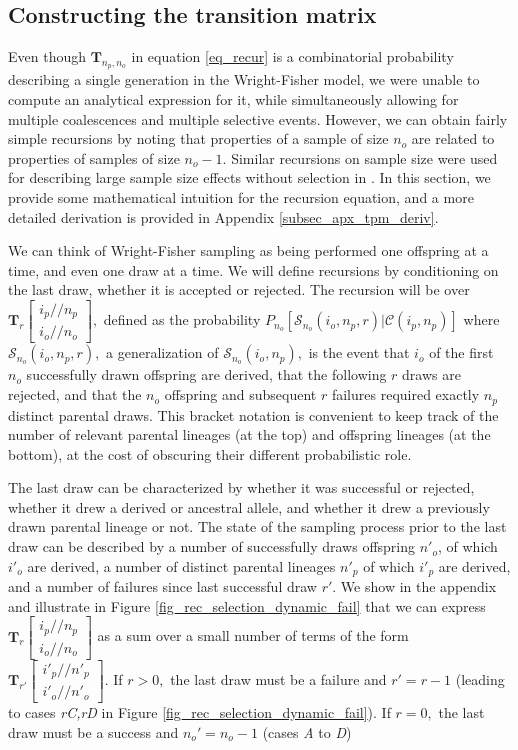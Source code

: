 \documentclass[review]{elsarticle}
\newcommand{\dslash}{/\!\!/}
\newcommand{\Coalc}[4]{\begin{bmatrix}#1\dslash #2 \\ #3\dslash #4 \end{bmatrix}}
\newcommand{\ms}{\mathcal{S}}
\begin{document}
\subsection{Constructing the transition matrix}
\label{subsec_trans_mat}

Even though $\mathbf{T}_{n_p,n_o}$ in equation \ref{eq_recur} is a combinatorial probability
describing a single generation in the Wright-Fisher model, we were unable to compute an analytical
expression for it, while simultaneously allowing for multiple coalescences and multiple selective events. 
However,
we can obtain fairly simple recursions by noting that properties of a sample of size $n_o$ are
related to properties of samples of size $n_o-1.$ Similar recursions on sample size were used for
describing large sample size effects without selection in \citep{BhaskarEtAl2014}. In this section,
we provide some mathematical intuition for the recursion equation, and a more detailed derivation is provided in
Appendix \ref{subsec_apx_tpm_deriv}.

We can think of Wright-Fisher sampling as being performed one offspring at a time,
and even one draw at a time. We will define recursions by conditioning on the last draw, 
whether it is accepted or rejected. 
The recursion will be over $\mathbf{T}_{r}\Coalc{i_p}{n_p}{i_o}{n_o},$ defined as the probability
$P_{n_o}\left[\ms_{n_o}(i_o, n_p, r) | \mathcal{C}(i_p, n_p)\right]$ where $\ms_{n_o}(i_o, n_p, r),$ 
a generalization of  $\ms_{n_o}(i_o, n_p),$ 
is the event that $i_o$ of the first $n_o$ successfully drawn offspring are derived, 
that the following $r$ draws are rejected, and that the $n_o$ offspring and subsequent $r$ failures 
required exactly $n_p$ distinct parental draws. 
This bracket notation is convenient to keep track of
the number of relevant parental lineages (at the top) and offspring lineages (at the bottom), at the
cost of obscuring their different probabilistic role.

The last draw can be characterized by whether it was successful or rejected, whether it drew a 
derived or ancestral allele, and whether it drew a previously drawn parental lineage or not. 
The state of the sampling process prior to the last draw can be described by a number of successfully draws 
offspring $n'_o$, of which $i'_o$ are derived, a number of distinct parental lineages 
$n'_p$ of which $i'_p$ are derived, and a number of failures since last successful draw $r'$.
We show in the appendix and illustrate in Figure \ref{fig_rec_selection_dynamic_fail}  that we 
can express $\mathbf{T}_{r}\Coalc{i_p}{n_p}{i_o}{n_o}$ as a sum over a small number of terms 
of the form $\mathbf{T}_{r'}\Coalc{i'_p}{n'_p}{i'_o}{n'_o}.$ If $r>0,$ the last draw must be a failure 
and $r' = r - 1$ (leading to cases \textit{rC,rD} in Figure \ref{fig_rec_selection_dynamic_fail}).
If $r=0,$ the last draw must be a success and $n_o' = n_o-1$ (cases \textit{A} to \textit{D})
\end{document}
